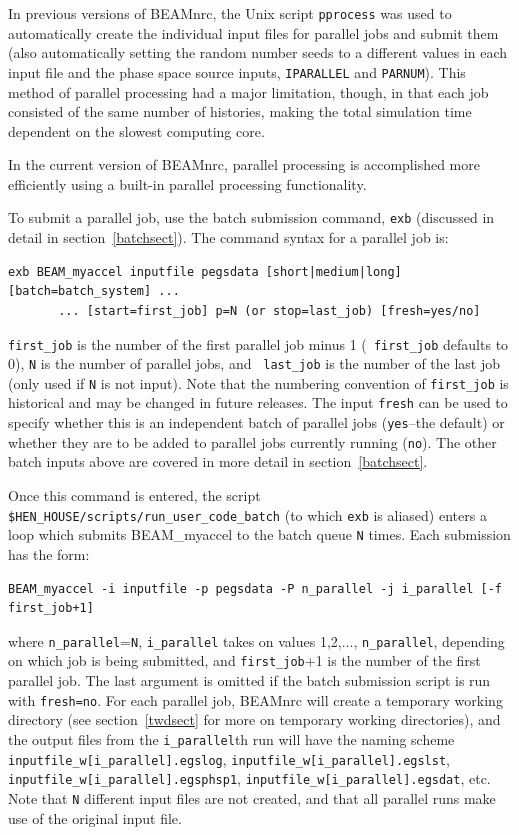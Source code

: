 \documentclass[12pt,twoside]{article}
\begin{document}
In previous versions of BEAMnrc, the Unix script {\tt pprocess} was used
to automatically create the individual input files for parallel
jobs and submit them (also automatically setting the random number
seeds to a different values in each input file and the phase space
 
source inputs, {\tt IPARALLEL} and {\tt PARNUM}).  This method
of parallel processing had a major limitation, though, in that each
job consisted of the same number of histories, making the total
simulation time dependent on the slowest computing core.

In the current version of BEAMnrc, parallel processing
is accomplished more efficiently using a built-in
parallel processing functionality.

To submit a parallel job, use the batch submission command,
{\tt exb} (discussed in
detail in section~\ref{batchsect}).  The command syntax for a parallel job is:
\begin{verbatim}
exb BEAM_myaccel inputfile pegsdata [short|medium|long] [batch=batch_system] ...
       ... [start=first_job] p=N (or stop=last_job) [fresh=yes/no]
\end{verbatim}

{\tt first\_job} is the number of the first parallel job minus 1 ({\tt
first\_job} defaults to 0), {\tt N} is the number of parallel jobs, and {\tt
last\_job} is the number of the last job (only used if {\tt N} is not input).
Note that the numbering convention of {\tt first\_job} is historical and may be
changed in future releases. The input {\tt fresh} can be used to specify whether
this is an independent batch of parallel jobs ({\tt yes}--the default) or
whether they are to be added to parallel jobs currently running ({\tt no}). The
other batch inputs above are covered in more detail in section~\ref{batchsect}.

Once this command is entered, the script
{\tt \$HEN\_HOUSE/scripts/run\_user\_code\_batch} (to which {\tt exb} is
aliased) enters a loop which submits BEAM\_myaccel to the batch queue
{\tt N} times.  Each submission has the form:
\begin{verbatim}
BEAM_myaccel -i inputfile -p pegsdata -P n_parallel -j i_parallel [-f first_job+1]
\end{verbatim}
where {\tt n\_parallel}={\tt N}, {\tt i\_parallel} takes on values 1,2,...,
{\tt n\_parallel}, depending on which job is being submitted, and
{\tt first\_job}+1 is the number of the first parallel job.  The last argument
is omitted if the batch submission script is run with {\tt fresh=no}.
For each parallel job, BEAMnrc will create a temporary working directory
(see section~\ref{twdsect} for more on
temporary working directories), and the output files from the
{\tt i\_parallel}th run will have the naming scheme
{\tt inputfile\_w[i\_parallel].egslog}, {\tt inputfile\_w[i\_parallel].egslst},\\
{\tt inputfile\_w[i\_parallel].egsphsp1},
{\tt inputfile\_w[i\_parallel].egsdat},
etc.  Note that {\tt N} different input files are not created, and that all
parallel runs make use of the original input file.
\end{document}
